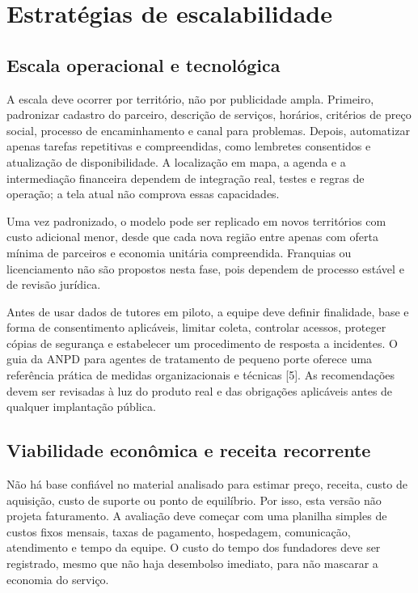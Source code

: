 \documentclass[12pt,a4paper]{article}
\begin{document}
\section{Estratégias de escalabilidade}

\subsection{Escala operacional e tecnológica}

A escala deve ocorrer por território, não por publicidade ampla. Primeiro, padronizar cadastro do parceiro, descrição de serviços, horários, critérios de preço social, processo de encaminhamento e canal para problemas. Depois, automatizar apenas tarefas repetitivas e compreendidas, como lembretes consentidos e atualização de disponibilidade. A localização em mapa, a agenda e a intermediação financeira dependem de integração real, testes e regras de operação; a tela atual não comprova essas capacidades.

Uma vez padronizado, o modelo pode ser replicado em novos territórios com custo adicional menor, desde que cada nova região entre apenas com oferta mínima de parceiros e economia unitária compreendida. Franquias ou licenciamento não são propostos nesta fase, pois dependem de processo estável e de revisão jurídica.

Antes de usar dados de tutores em piloto, a equipe deve definir finalidade, base e forma de consentimento aplicáveis, limitar coleta, controlar acessos, proteger cópias de segurança e estabelecer um procedimento de resposta a incidentes. O guia da ANPD para agentes de tratamento de pequeno porte oferece uma referência prática de medidas organizacionais e técnicas [5]. As recomendações devem ser revisadas à luz do produto real e das obrigações aplicáveis antes de qualquer implantação pública.

\subsection{Viabilidade econômica e receita recorrente}

Não há base confiável no material analisado para estimar preço, receita, custo de aquisição, custo de suporte ou ponto de equilíbrio. Por isso, esta versão não projeta faturamento. A avaliação deve começar com uma planilha simples de custos fixos mensais, taxas de pagamento, hospedagem, comunicação, atendimento e tempo da equipe. O custo do tempo dos fundadores deve ser registrado, mesmo que não haja desembolso imediato, para não mascarar a economia do serviço.
\end{document}
